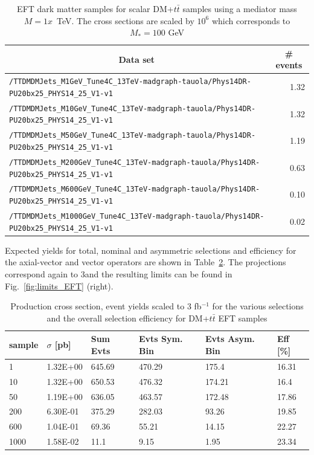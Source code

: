 \begin{table}[h!]
  \small
    \centering
    \caption{EFT dark matter samples for scalar DM+$t\bar{t}$ samples using a mediator mass $M=1x$~TeV. The cross sections are scaled by $10^6$ which corresponds to $M_*=100$ GeV \label{tab:datasets_dmtt}}
    \begin{tabular}{lr}
      \hline\hline
      \multicolumn{1}{c}{Data set}&\multicolumn{1}{c}{\# events}\tabularnewline
      \hline
      {\footnotesize \verb!/TTDMDMJets_M1GeV_Tune4C_13TeV-madgraph-tauola/Phys14DR- PU20bx25_PHYS14_25_V1-v1!}   & 1.32 \tabularnewline
      {\footnotesize \verb!/TTDMDMJets_M10GeV_Tune4C_13TeV-madgraph-tauola/Phys14DR- PU20bx25_PHYS14_25_V1-v1!}  & 1.32 \tabularnewline
      {\footnotesize \verb!/TTDMDMJets_M50GeV_Tune4C_13TeV-madgraph-tauola/Phys14DR- PU20bx25_PHYS14_25_V1-v1!}  & 1.19 \tabularnewline
      {\footnotesize \verb!/TTDMDMJets_M200GeV_Tune4C_13TeV-madgraph-tauola/Phys14DR- PU20bx25_PHYS14_25_V1-v1!} & 0.63 \tabularnewline
      {\footnotesize \verb!/TTDMDMJets_M600GeV_Tune4C_13TeV-madgraph-tauola/Phys14DR- PU20bx25_PHYS14_25_V1-v1!} & 0.10 \tabularnewline
      {\footnotesize \verb!/TTDMDMJets_M1000GeV_Tune4C_13TeV-madgraph-tauola/Phys14DR- PU20bx25_PHYS14_25_V1-v1!}& 0.02 \tabularnewline
      \hline \hline
\end{tabular}
\end{table}

Expected yields for total, nominal and asymmetric selections and efficiency for the axial-vector and vector operators are shown in Table~\ref{tab:dm_dmtt_EFT_g1}.
The projections correspond again to 3\fbinv and the resulting limits can be found in Fig.~\ref{fig:limits_EFT} (right).

\begin{table}[h!]
\centering
\begin{tabular}{llllll}
\hline
sample             & $\sigma$ [pb] & Sum Evts       & Evts Sym. Bin & Evts Asym. Bin & Eff  [\%]   \\\hline
1    & 1.32E+00 & 645.69 & 470.29 & 175.4  & 16.31 \\
10   & 1.32E+00 & 650.53 & 476.32 & 174.21 & 16.4  \\
50   & 1.19E+00 & 636.05 & 463.57 & 172.48 & 17.86 \\
200  & 6.30E-01 & 375.29 & 282.03 & 93.26  & 19.85 \\
600  & 1.04E-01 & 69.36  & 55.21  & 14.15  & 22.27\\
1000 & 1.58E-02 & 11.1   & 9.15   & 1.95   & 23.34 \\
\hline
\end{tabular}
\caption{Production cross section, event yields scaled to 3 fb$^{-1 }$ for the various selections and the overall selection efficiency for DM+$t\bar{t}$ EFT samples}
\label{tab:dm_dmtt_EFT_g1}
\end{table}


